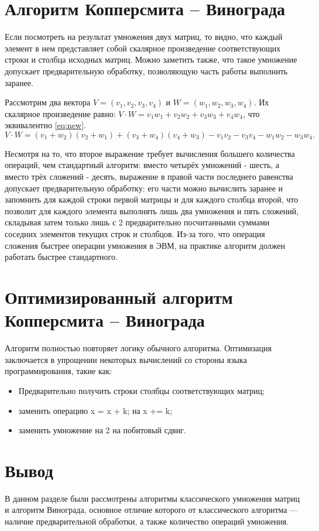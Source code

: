 \section{Алгоритм Копперсмита -- Винограда}

Если посмотреть на результат умножения двух матриц, то видно, что каждый элемент в нем представляет собой скалярное произведение соответствующих строки и столбца исходных матриц.
Можно заметить также, что такое умножение допускает предварительную обработку, позволяющую часть работы выполнить заранее.

Рассмотрим два вектора $V = (v_1, v_2, v_3, v_4)$ и $W = (w_1, w_2, w_3, w_4)$.
Их скалярное произведение равно: $V \cdot W = v_1w_1 + v_2w_2 + v_3w_3 + v_4w_4$, что эквивалентно \eqref{eq:new}.
\begin{equation}
    \label{eq:new}
    V \cdot W = (v_1 + w_2)(v_2 + w_1) + (v_3 + w_4)(v_4 + w_3) - v_1v_2 - v_3v_4 - w_1w_2 - w_3w_4.
\end{equation}

Несмотря на то, что второе выражение требует вычисления большего количества операций, чем стандартный алгоритм: вместо четырёх умножений - шесть, а вместо трёх сложений - десять, выражение в правой части последнего равенства допускает предварительную обработку: его части можно вычислить заранее и запомнить для каждой строки первой матрицы и для каждого столбца второй, что позволит для каждого элемента выполнять лишь два умножения и пять сложений, складывая затем только лишь с 2 предварительно посчитанными суммами соседних элементов текущих строк и столбцов.
Из-за того, что операция сложения быстрее операции умножения в ЭВМ, на практике алгоритм должен работать быстрее стандартного.

\section{Оптимизированный алгоритм Копперсмита -- Винограда}

Алгоритм полностью повторяет логику обычного алгоритма.
Оптимизация заключается в упрощении некоторых вычислений со стороны языка программирования, такие как:

\begin{itemize}
    \item Предварительно получить строки столбцы соответствующих матриц;
    \item заменить операцию x = x + k; на x += k;
    \item заменить умножение на 2 на побитовый сдвиг.
\end{itemize}

\section*{Вывод}
В данном разделе были рассмотрены алгоритмы классического умножения матриц и алгоритм Винограда, основное отличие которого от классического алгоритма — наличие предварительной обработки, а также количество операций умножения.
\clearpage
